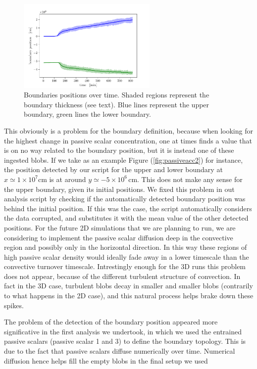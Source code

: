 \begin{figure}[t!]
\centering
\includegraphics[width=0.6\textwidth]{./img/boundpos.pdf}
\caption{Boundaries positions over time. Shaded regions represent the boundary thickness (see text). Blue lines represent the upper boundary, green lines the lower boundary.}
\label{fig:boundpos}
\end{figure}
  This obviously is a problem for the boundary definition, because when looking for the highest change in passive scalar concentration, one at times finds a value that is on no way related to the boundary position, but it is instead one of these ingested blobs. If we take as an example Figure (\ref{fig:passiveacc2}) for instance, the position detected by our script for the upper and lower boundary at $x \simeq 1 \times 10^{7} \mathrm{cm}$ is at around $y \simeq - 5 \times 10^{6} \, \mathrm{cm}$. This does not make any sense for the upper boundary, given its initial positions. We fixed this problem in out analysis script by checking if the automatically detected boundary position was behind the initial position. If this was the case, the script automatically considers the data corrupted, and substitutes it with the mean value of the other detected positions. For the future 2D simulations that we are planning to run, we are considering to implement the passive scalar diffusion deep in the convective region and possibly only in the horizontal direction. In this way these regions of high passive scalar density would ideally fade away in a lower timescale than the convective turnover timescale. Intrestingly enough for the 3D runs this problem does not appear, because of the different turbulent structure of convection. In fact in the 3D case, turbulent blobs decay in smaller and smaller blobs (contrarily to what happens in the 2D case), and this natural process helps brake down these spikes.

  The problem of the detection of the boundary position appeared more significative in the first analysis we undertook, in which we used the entrained passive scalars (passive scalar 1 and 3) to define the boundary topology. This is due to the fact that passive scalars diffuse numerically over time. Numerical diffusion hence helps fill the empty blobs in the final setup we used

